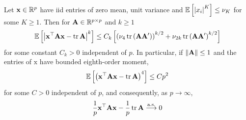 \begin{lemma}\label{lem:quadratic-form-close-to-the-trace}
	Let \(\mathbf{x} \in \mathbb{R}^{p}\) have iid entries of zero mean, unit variance and \(\mathbb{E}\left[\left|x_{i}\right|^{K}\right] \leq \nu_{K}\) for some \(K \geq 1\). Then for \(\mathbf{A} \in \mathbb{R}^{p \times p}\) and \(k \geq 1\)
	\begin{equation*}
		\mathbb{E}\left[\left|\mathbf{x}^{\top} \mathbf{A} \mathbf{x}-\operatorname{tr} \mathbf{A}\right|^{k}\right] \leq C_{k}\left[\left(\nu_{4} \operatorname{tr}\left(\mathbf{A} \mathbf{A}^{\prime}\right)\right)^{k / 2}+\nu_{2 k} \operatorname{tr}\left(\mathbf{A} \mathbf{A}^{\prime}\right)^{k / 2}\right]
	\end{equation*}
	for some constant \(C_{k}>0\) independent of \(p\). In particular, if \(\|\mathbf{A}\| \leq 1\) and the entries of \(\mathrm{x}\) have bounded eighth-order moment,
	\begin{equation*}
		\mathbb{E}\left[\left(\mathbf{x}^{\top} \mathbf{A} \mathbf{x}-\operatorname{tr} \mathbf{A}\right)^{4}\right] \leq C p^{2}
	\end{equation*}
	for some \(C>0\) independent of \(p\), and consequently, as \(p \rightarrow \infty\),
	\begin{equation*}
		\frac{1}{p} \mathbf{x}^{\top} \mathbf{A} \mathbf{x}-\frac{1}{p} \operatorname{tr} \mathbf{A} \stackrel{\text {a.s.}}{\longrightarrow} 0
	\end{equation*}
\end{lemma}
